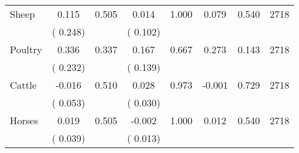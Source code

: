 \begin{tabular}{l*{7}{c}}
 Sheep       &              0.115       &        0.505  &              0.014       &        1.000  &              0.079       &              0.540 &  2718 \\ 
                       &       (       0.248)             &                               &       (       0.102)                     &                               &                                               &                                &                      \\ 

 Poultry       &              0.336       &        0.337  &              0.167       &        0.667  &              0.273       &              0.143 &  2718 \\ 
                       &       (       0.232)             &                               &       (       0.139)                     &                               &                                               &                                &                      \\ 

 Cattle       &             -0.016       &        0.510  &              0.028       &        0.973  &             -0.001       &              0.729 &  2718 \\ 
                       &       (       0.053)             &                               &       (       0.030)                     &                               &                                               &                                &                      \\ 

 Horses       &              0.019       &        0.505  &             -0.002       &        1.000  &              0.012       &              0.540 &  2718 \\ 
                       &       (       0.039)             &                               &       (       0.013)                     &                               &                                               &                                &                      \\ 

\hline \end{tabular}